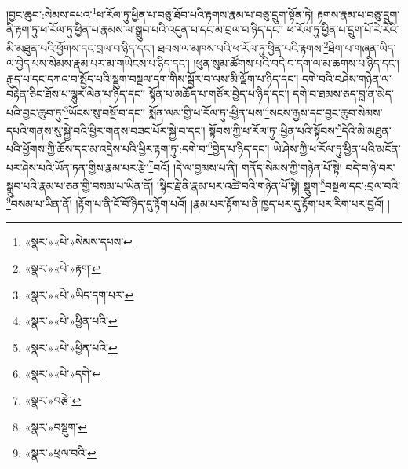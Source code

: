 །བྱང་ཆུབ་:སེམས་དཔའ་\footnote{«སྣར་»«པེ་»སེམས་དཔས་}ཕ་རོལ་ཏུ་ཕྱིན་པ་བཅུ་ཐོབ་པའི་རྟགས་རྣམ་པ་བཅུ་དྲུག་སྟོན་ཏེ། རྟགས་རྣམ་པ་བཅུ་དྲུག་ནི་རྟག་ཏུ་ཕ་རོལ་ཏུ་ཕྱིན་པ་རྣམས་ལ་སྒྲུབ་པའི་འདུན་པ་དང་མ་བྲལ་བ་ཉིད་དང་། ཕ་རོལ་ཏུ་ཕྱིན་པ་དྲུག་པོ་རེ་རེའི་མི་མཐུན་པའི་ཕྱོགས་དང་བྲལ་བ་ཉིད་དང་། ཐབས་ལ་མཁས་པའི་ཕ་རོལ་ཏུ་ཕྱིན་པའི་རྟགས་\footnote{«སྣར་»«པེ་»རྟག་}ཐེག་པ་གཞན་ཡིད་ལ་བྱེད་པས་སེམས་རྣམ་པར་མ་གཡེངས་པ་ཉིད་དང་། །ཕུན་སུམ་ཚོགས་པའི་བདེ་བ་དག་ལ་མ་ཆགས་པ་ཉིད་དང་། རྒུད་པ་དང་དཀའ་བ་སྤྱོད་པའི་སྡུག་བསྔལ་དག་གིས་སྦྱོར་བ་ལས་མི་ལྡོག་པ་ཉིད་དང་། དགེ་བའི་བཤེས་གཉེན་ལ་བརྟེན་ཅིང་ཐོས་པ་ལྷུར་ལེན་པ་ཉིད་དང་། སྟོན་པ་མཆོད་པ་གཙོར་བྱེད་པ་ཉིད་དང་། དགེ་བ་ཐམས་ཅད་བླ་ན་མེད་པའི་བྱང་ཆུབ་ཏུ་\footnote{«སྣར་»«པེ་»ཡིད་དག་པར་}ཡོངས་སུ་བསྔོ་བ་དང་། སྨོན་ལམ་གྱི་ཕ་རོལ་ཏུ་:ཕྱིན་པས་\footnote{«སྣར་»«པེ་»ཕྱིན་པའི་}སངས་རྒྱས་དང་བྱང་ཆུབ་སེམས་དཔའི་གནས་སུ་སྐྱེ་བའི་ཕྱིར་གནས་བཟང་པོར་སྐྱེ་བ་དང་། སྟོབས་ཀྱི་ཕ་རོལ་ཏུ་:ཕྱིན་པའི་སྟོབས་\footnote{«སྣར་»«པེ་»ཕྱིན་པའི་}དེའི་མི་མཐུན་པའི་ཕྱོགས་ཀྱི་ཆོས་དང་མ་འདྲེས་པའི་ཕྱིར་རྟག་ཏུ་:དགེ་བ་\footnote{«སྣར་»«པེ་»དགེ་}བྱེད་པ་ཉིད་དང་། ཡེ་ཤེས་ཀྱི་ཕ་རོལ་ཏུ་ཕྱིན་པའི་མངོན་པར་ཤེས་པའི་ཡོན་ཏན་གྱིས་རྣམ་པར་རྩེ་\footnote{«སྣར་»བརྩེ་}བའོ། །དེ་ལ་བྱམས་པ་ནི། གནོད་སེམས་ཀྱི་གཉེན་པོ་སྟེ། བདེ་བ་ཉེ་བར་སྒྲུབ་པའི་རྣམ་པ་ཅན་གྱི་བསམ་པ་ཡིན་ནོ། །སྙིང་རྗེ་ནི་རྣམ་པར་འཚེ་བའི་གཉེན་པོ་སྟེ། སྡུག་\footnote{«སྣར་»བསྡུག་}བསྔལ་དང་:བྲལ་བའི་\footnote{«སྣར་»ཕྲལ་བའི་}བསམ་པ་ཡིན་ནོ། །རྟོག་པ་ནི་ངོ་བོ་ཉིད་དུ་རྟོག་པའོ། །རྣམ་པར་རྟོག་པ་ནི་ཁྱད་པར་དུ་རྟོག་པར་རིག་པར་བྱའོ། །
